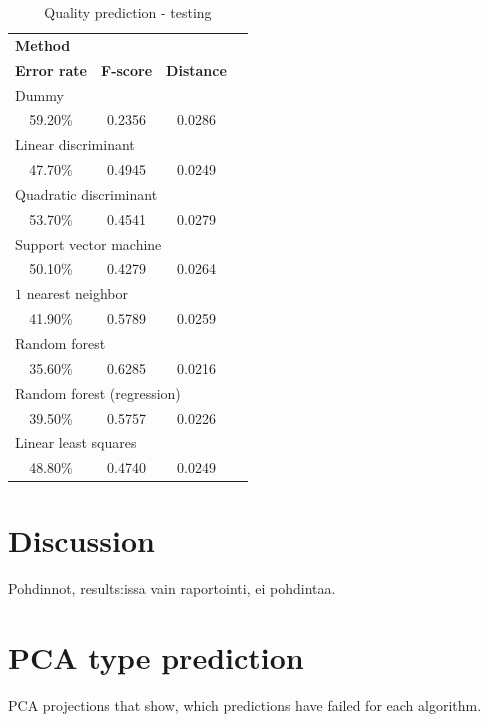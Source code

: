 \documentclass[twoside]{article}
\begin{document}
\begin{multicols}{2}
\begin{table}[H]
\caption{Quality prediction - testing}
\label{table:quality_testing}
\centering
\begin{tabular}{cccc}
\multicolumn{3}{l}{\textbf{Method}} \\
\textbf{Error rate} & \textbf{F-score} & \textbf{Distance} \\
\midrule
\multicolumn{3}{l}{Dummy} \\
59.20\% & 0.2356 & 0.0286 \\
\multicolumn{3}{l}{Linear discriminant} \\
47.70\% & 0.4945 & 0.0249 \\
\multicolumn{3}{l}{Quadratic discriminant} \\
53.70\% & 0.4541 & 0.0279 \\
\multicolumn{3}{l}{Support vector machine} \\
50.10\% & 0.4279 & 0.0264 \\
\multicolumn{3}{l}{$1$ nearest neighbor} \\
41.90\% & 0.5789 & 0.0259 \\
\multicolumn{3}{l}{Random forest} \\
35.60\% & 0.6285 & 0.0216 \\
\multicolumn{3}{l}{Random forest (regression)} \\
39.50\% & 0.5757 & 0.0226 \\
\multicolumn{3}{l}{Linear least squares} \\
48.80\% & 0.4740 & 0.0249 \\
\end{tabular}
\end{table}


\section{Discussion}

Pohdinnot, results:issa vain raportointi, ei pohdintaa.



{}

\appendix

\section{PCA type prediction}\label{appendix:colorpcakuvet}
PCA projections that show, which predictions have failed for each algorithm.


\end{multicols}
\end{document}
